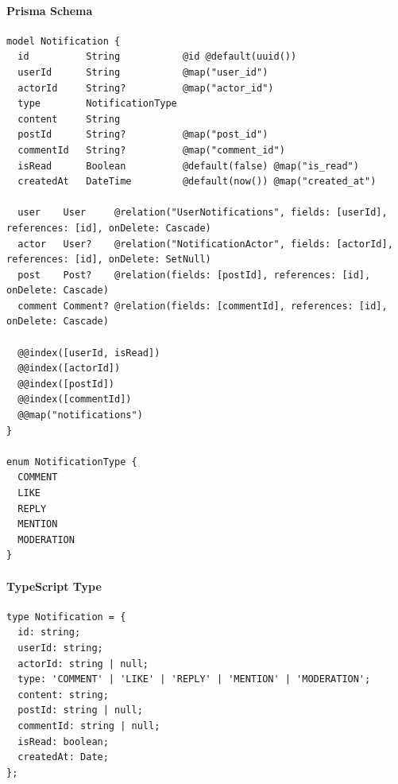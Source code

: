 \documentclass[11pt,a4paper]{article}
\begin{document}
\paragraph{Prisma Schema}
\begin{lstlisting}
model Notification {
  id          String           @id @default(uuid())
  userId      String           @map("user_id")
  actorId     String?          @map("actor_id")
  type        NotificationType
  content     String
  postId      String?          @map("post_id")
  commentId   String?          @map("comment_id")
  isRead      Boolean          @default(false) @map("is_read")
  createdAt   DateTime         @default(now()) @map("created_at")
  
  user    User     @relation("UserNotifications", fields: [userId], references: [id], onDelete: Cascade)
  actor   User?    @relation("NotificationActor", fields: [actorId], references: [id], onDelete: SetNull)
  post    Post?    @relation(fields: [postId], references: [id], onDelete: Cascade)
  comment Comment? @relation(fields: [commentId], references: [id], onDelete: Cascade)
  
  @@index([userId, isRead])
  @@index([actorId])
  @@index([postId])
  @@index([commentId])
  @@map("notifications")
}

enum NotificationType {
  COMMENT
  LIKE
  REPLY
  MENTION
  MODERATION
}
\end{lstlisting}

\paragraph{TypeScript Type}
\begin{lstlisting}
type Notification = {
  id: string;
  userId: string;
  actorId: string | null;
  type: 'COMMENT' | 'LIKE' | 'REPLY' | 'MENTION' | 'MODERATION';
  content: string;
  postId: string | null;
  commentId: string | null;
  isRead: boolean;
  createdAt: Date;
};
\end{lstlisting}
\end{document}
